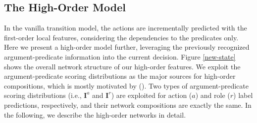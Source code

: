 \documentclass[letterpaper]{article} \usepackage{aaai21}  \usepackage{times}  \usepackage{helvet} \usepackage{courier}  \usepackage[hyphens]{url}  \usepackage{graphicx} \urlstyle{rm} \def\UrlFont{\rm}  \usepackage{natbib}  \usepackage{caption}
\begin{document}
\begin{CJK}{UTF8}{gbsn}
\begin{table*}[!t]
\begin{center}
\end{center}
  \caption{
  Results on CoNLL09 English in-domain test set.
  Decode means decoding speed (token per second).
  }
  \label{English-in-domain}
\end{table*}






\subsection{The High-Order Model}


In the vanilla transition model, the actions are incrementally predicted with the first-order local features,
considering the dependencies to the predicates only.
Here we present a high-order model further, leveraging the previously recognized argument-predicate information into the current decision.
Figure \ref{new-state} shows the overall network structure of our high-order features.
We exploit the argument-predicate scoring distributions as the major sources for high-order compositions,
which is mostly motivated by \citeauthor{lyu-etal-2019-semantic} (\citeyear{lyu-etal-2019-semantic}).
Two types of argument-predicate scoring distributions (i.e., $\bm{I}^a$ and $\bm{I}^r$) are exploited for action ($a$) and role ($r$) label predictions, respectively,
and their network compositions are exactly the same.
In the following, we describe the high-order networks in detail.







\end{CJK}
\end{document}
